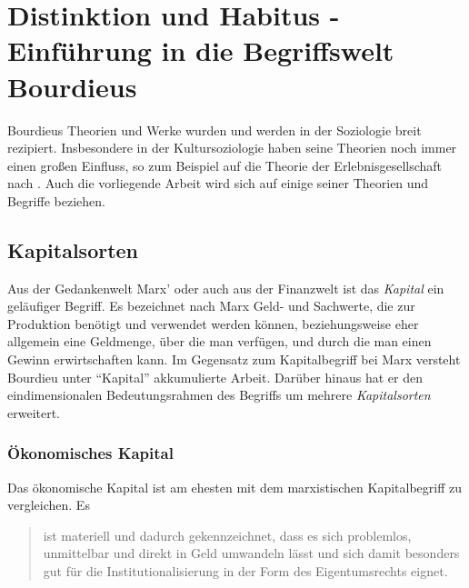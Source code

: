 \documentclass[a4paper, german, oneside]{scrbook}
\newcommand{\citet}[1]{\textcite{#1}}
\begin{document}


\chapter{Distinktion und Habitus - Einführung in die Begriffswelt Bourdieus}
Bourdieus Theorien und Werke wurden und werden in der Soziologie breit rezipiert. Insbesondere in der Kultursoziologie haben seine Theorien noch immer einen großen Einfluss, so zum Beispiel auf die Theorie der Erlebnisgesellschaft nach \citet{schulze_erlebnisgesellschaft:_1993}. \parencite[vgl.][555]{joas_sozialtheorie:_2004} Auch die vorliegende Arbeit wird sich auf einige seiner Theorien und Begriffe beziehen. 

\section{Kapitalsorten}
Aus der Gedankenwelt Marx' oder auch aus der Finanzwelt ist das \emph{Kapital} ein geläufiger Begriff. Es bezeichnet nach Marx Geld- und Sachwerte, die zur Produktion benötigt und verwendet werden können, beziehungsweise eher allgemein eine Geldmenge, über die man verfügen, und durch die man einen Gewinn erwirtschaften kann. \parencite{Kapital} Im Gegensatz zum Kapitalbegriff bei Marx versteht Bourdieu unter \enquote{Kapital} akkumulierte Arbeit. \parencite[vgl.][86]{luthje_medium_2008} Darüber hinaus hat er den eindimensionalen Bedeutungsrahmen des Begriffs um mehrere \emph{Kapitalsorten} erweitert. 


\subsection{Ökonomisches Kapital}
Das ökonomische Kapital ist am ehesten mit dem marxistischen Kapitalbegriff zu vergleichen. Es \blockquote[{\cite[86]{luthje_medium_2008}}]{ist materiell und dadurch gekennzeichnet, dass es sich problemlos, unmittelbar und direkt in Geld umwandeln lässt und sich damit besonders gut für die Institutionalisierung in der Form des Eigentumsrechts eignet.}
\end{document}
